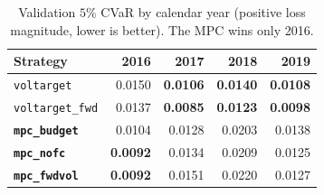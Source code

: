 \documentclass[journal]{IEEEtran}
\newcommand{\ours}[1]{\textcolor{blue!70!black}{\textbf{#1}}}
\newcommand{\best}[1]{\textbf{#1}}
\begin{document}
\begin{table}[!t]
  \centering
  \caption{Validation $5\%$ CVaR by calendar year (positive loss magnitude, lower
  is better). The MPC wins only 2016.}
  \label{tab:years}
  \begin{tabular}{lrrrr}
    \toprule
    Strategy & 2016 & 2017 & 2018 & 2019 \\
    \midrule
    \texttt{voltarget}       & 0.0150 & \best{0.0106} & \best{0.0140} & \best{0.0108} \\
    \texttt{voltarget\_fwd}  & 0.0137 & \best{0.0085} & \best{0.0123} & \best{0.0098} \\
    \ours{\texttt{mpc\_budget}}  & 0.0104 & 0.0128 & 0.0203 & 0.0138 \\
    \ours{\texttt{mpc\_nofc}}    & \best{0.0092} & 0.0134 & 0.0209 & 0.0125 \\
    \ours{\texttt{mpc\_fwdvol}}  & \best{0.0092} & 0.0151 & 0.0220 & 0.0127 \\
    \bottomrule
  \end{tabular}
\end{table}
\end{document}
